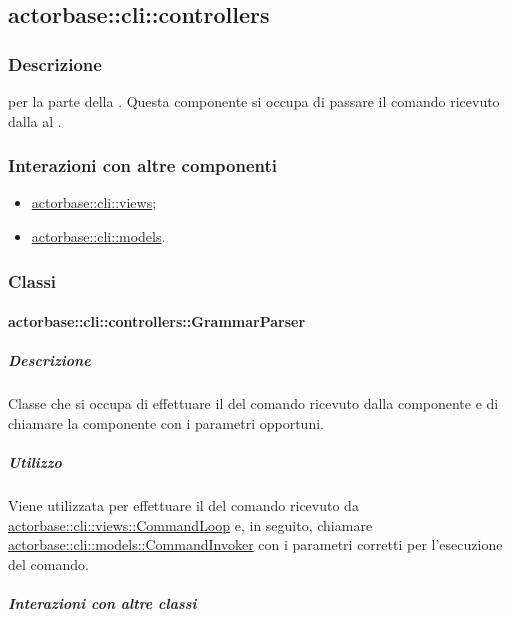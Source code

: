 \documentclass{scalatekids-article}
\begin{document}
\subsection{actorbase::cli::controllers}
\label{sec:actorbase::cli::controllers}

\subsubsection{Descrizione}

 per la parte  della . Questa
componente si occupa di passare il comando ricevuto dalla  al
.

\subsubsection{Interazioni con altre componenti}

\begin{itemize}
\item \hyperref[sec:actorbase::cli::views]{actorbase::cli::views};
\item \hyperref[sec:actorbase::cli::models]{actorbase::cli::models}.
\end{itemize}

\subsubsection{Classi}

\paragraph{actorbase::cli::controllers::GrammarParser}
\label{sec:actorbase::cli::controllers::GrammarParser}

\subparagraph{Descrizione}

Classe che si occupa di effettuare il  del comando ricevuto
dalla componente  e di chiamare la componente  con i
parametri opportuni.

\subparagraph{Utilizzo}

Viene utilizzata per effettuare il  del comando ricevuto da
\hyperref[sec:actorbase::cli::views::CommandLoop]{actorbase::cli::views::CommandLoop} e, in seguito, chiamare
\hyperref[sec:actorbase::cli::models::CommandInvoker]{actorbase::cli::models::CommandInvoker} con i parametri corretti per
l'esecuzione del comando.

\subparagraph{Interazioni con altre classi}
\end{document}
